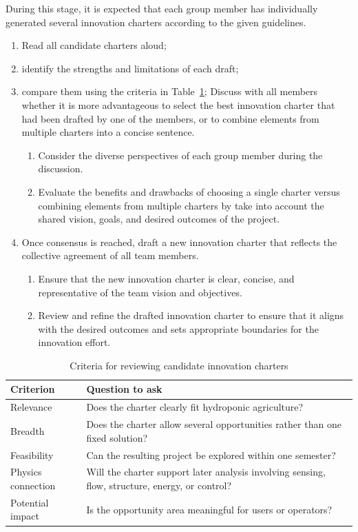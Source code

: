 During this stage, it is expected that each group member has individually generated several innovation charters according to the given guidelines.
\begin{enumerate}
    \item Read all candidate charters aloud;
    \item identify the strengths and limitations of each draft;
    \item compare them using the criteria in Table~\ref{tab:session3-charter-criteria};
    Discuss with all members whether it is more advantageous to select the best innovation charter that had been drafted by one of the members, or to combine elements from multiple charters into a concise sentence.
    \begin{enumerate}
        \item Consider the diverse perspectives of each group member during the discussion.
        \item Evaluate the benefits and drawbacks of choosing a single charter versus combining elements from multiple charters by take into account the shared vision, goals, and desired outcomes of the project.
    \end{enumerate}
    \item Once consensus is reached, draft a new innovation charter that reflects the collective agreement of all team members.
    \begin{enumerate}
        \item Ensure that the new innovation charter is clear, concise, and representative of the team vision and objectives.
        \item Review and refine the drafted innovation charter to ensure that it aligns with the desired outcomes and sets appropriate boundaries for the innovation effort.
    \end{enumerate}
\end{enumerate}


\begin{table}[htbp]
\centering
\caption{Criteria for reviewing candidate innovation charters}
\label{tab:session3-charter-criteria}
\renewcommand{\arraystretch}{1.2}
\begin{tabularx}{\textwidth}{|>{\raggedright\arraybackslash}p{}|X|}
\hline
\textbf{Criterion} & \textbf{Question to ask} \\
\hline
Relevance & Does the charter clearly fit hydroponic agriculture? \\
\hline
Breadth & Does the charter allow several opportunities rather than one fixed solution? \\
\hline
Feasibility & Can the resulting project be explored within one semester? \\
\hline
Physics connection & Will the charter support later analysis involving sensing, flow, structure, energy, or control? \\
\hline
Potential impact & Is the opportunity area meaningful for users or operators? \\
\hline
\end{tabularx}
\end{table}

